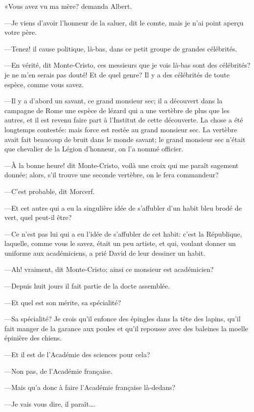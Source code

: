 «Vous avez vu ma mère? demanda Albert. 

—Je viens d'avoir l'honneur de la saluer, dit le comte, mais je n'ai point aperçu votre père. 

—Tenez! il cause politique, là-bas, dans ce petit groupe de grandes célébrités. 

—En vérité, dit Monte-Cristo, ces messieurs que je vois là-bas sont des célébrités? je ne m'en serais pas douté! Et de quel genre? Il y a des célébrités de toute espèce, comme vous savez. 

—Il y a d'abord un savant, ce grand monsieur sec; il a découvert dans la campagne de Rome une espèce de lézard qui a une vertèbre de plus que les autres, et il est revenu faire part à l'Institut de cette découverte. La chose a été longtemps contestée: mais force est restée au grand monsieur sec. La vertèbre avait fait beaucoup de bruit dans le monde savant; le grand monsieur sec n'était que chevalier de la Légion d'honneur, on l'a nommé officier. 

—À la bonne heure! dit Monte-Cristo, voilà une croix qui me paraît sagement donnée; alors, s'il trouve une seconde vertèbre, on le fera commandeur? 

—C'est probable, dit Morcerf. 

—Et cet autre qui a eu la singulière idée de s'affubler d'un habit bleu brodé de vert, quel peut-il être? 

—Ce n'est pas lui qui a eu l'idée de s'affubler de cet habit: c'est la République, laquelle, comme vous le savez, était un peu artiste, et qui, voulant donner un uniforme aux académiciens, a prié David de leur dessiner un habit. 

—Ah! vraiment, dit Monte-Cristo; ainsi ce monsieur est académicien? 

—Depuis huit jours il fait partie de la docte assemblée. 

—Et quel est son mérite, sa spécialité? 

—Sa spécialité? Je crois qu'il enfonce des épingles dans la tête des lapins, qu'il fait manger de la garance aux poules et qu'il repousse avec des baleines la moelle épinière des chiens. 

—Et il est de l'Académie des sciences pour cela? 

—Non pas, de l'Académie française. 

—Mais qu'a donc à faire l'Académie française là-dedans? 

—Je vais vous dire, il paraît\dots. 

